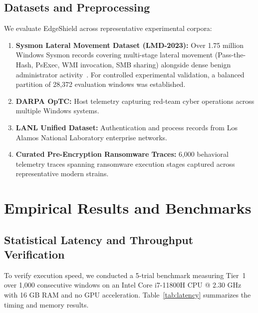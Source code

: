 \documentclass[10pt,journal,compsoc]{IEEEtran}
\begin{document}
\subsection{Datasets and Preprocessing}
We evaluate EdgeShield across representative experimental corpora:
\begin{enumerate}
    \item \textbf{Sysmon Lateral Movement Dataset (LMD-2023):} Over 1.75 million Windows Sysmon records covering multi-stage lateral movement (Pass-the-Hash, PsExec, WMI invocation, SMB sharing) alongside dense benign administrator activity~\cite{smiliotopoulos2023}. For controlled experimental validation, a balanced partition of 28,372 evaluation windows was established.
    \item \textbf{DARPA OpTC:} Host telemetry capturing red-team cyber operations across multiple Windows systems.
    \item \textbf{LANL Unified Dataset:} Authentication and process records from Los Alamos National Laboratory enterprise networks.
    \item \textbf{Curated Pre-Encryption Ransomware Traces:} 6,000 behavioral telemetry traces spanning ransomware execution stages captured across representative modern strains.
\end{enumerate}

\section{Empirical Results and Benchmarks}
\subsection{Statistical Latency and Throughput Verification}
To verify execution speed, we conducted a 5-trial benchmark measuring Tier~1 over 1,000 consecutive windows on an Intel Core i7-11800H CPU @ 2.30 GHz with 16 GB RAM and no GPU acceleration. Table~\ref{tab:latency} summarizes the timing and memory results.
\end{document}
